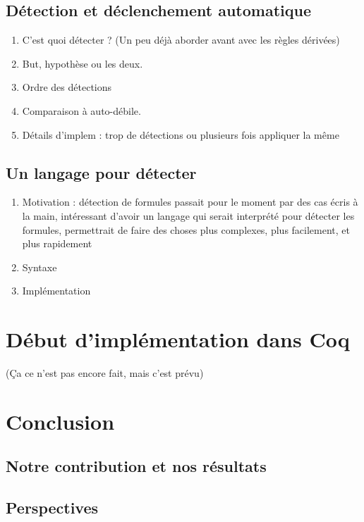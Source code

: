 \documentclass[titlepage,draft]{article}
\begin{document}
\subsection{Détection et déclenchement automatique}
\begin{enumerate}
    \item C'est quoi détecter ? (Un peu déjà aborder avant avec les règles dérivées)
    \item But, hypothèse ou les deux.
    \item Ordre des détections
    \item Comparaison à auto-débile.
    \item Détails d'implem : trop de détections ou plusieurs fois appliquer la même
\end{enumerate}

\subsection{Un langage pour détecter}
\begin{enumerate}
    \item Motivation : détection de formules passait pour le moment par des cas écris à la main, intéressant d'avoir un langage qui serait interprété pour détecter les formules, permettrait de faire des choses plus complexes, plus facilement, et plus rapidement
    \item Syntaxe
    \item Implémentation
\end{enumerate}



\section{Début d'implémentation dans Coq} \label{Implémentation}
(Ça ce n'est pas encore fait, mais c'est prévu)



\section{Conclusion}
\subsection{Notre contribution et nos résultats}
\subsection{Perspectives}
\end{document}
